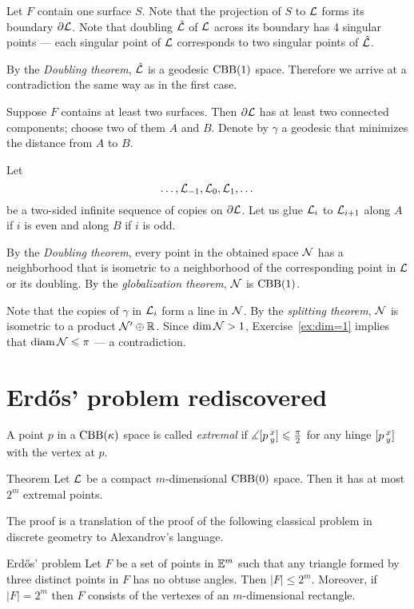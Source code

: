 Let $F$ contain one surface $S$.
Note that the projection of $S$ to $\mathcal{L}$ forms its boundary $\partial \mathcal{L}$.
Note that doubling $\hat {\mathcal{L}}$ of $\mathcal{L}$ across its boundary has 4 singular points --- each singular point of $\mathcal{L}$ corresponds to two singular points of $\hat {\mathcal{L}}$.

By the \emph{Doubling theorem}, $\hat {\mathcal{L}}$ is a geodesic $\mathrm{CBB}(1)$ space.
Therefore we arrive at a contradiction the same way as in the first case.

Suppose $F$ contains at least two surfaces.
Then $\partial\mathcal{L}$ has at least two connected components; choose two of them $A$ and $B$.
Denote by $\gamma$ a geodesic that minimizes the distance from $A$ to $B$.

Let 
\[\dots,\mathcal{L}_{-1},\mathcal{L}_{0},\mathcal{L}_{1},\dots\]
be a two-sided infinite sequence of copies on $\partial\mathcal{L}$.
Let us glue $\mathcal{L}_{i}$ to $\mathcal{L}_{i+1}$ along $A$ if $i$ is even and along $B$ if $i$ is odd.

By the \emph{Doubling theorem}, every point in the obtained space $\mathcal{N}$ has a neighborhood that is isometric to a neighborhood of the corresponding point in $\mathcal{L}$ or its doubling.
By the \emph{globalization theorem}, $\mathcal{N}$ is $\mathrm{CBB}(1)$.

Note that the copies of $\gamma$ in $\mathcal{L}_{i}$ form a line in $\mathcal{N}$.
By the \emph{splitting theorem}, $\mathcal{N}$ is isometric to a product $\mathcal{N}'\oplus \mathbb{R}$.
Since $\operatorname{\rm dim}\nolimits\mathcal{N}>1$, Exercise~\ref{ex:dim=1} implies that $\operatorname{\rm diam}\nolimits\mathcal{N}\leqslant \pi$ --- a contradiction.
\qeds

\section{Erd\H{o}s' problem rediscovered}

A point $p$ in a $\mathrm{CBB}(\kappa)$ space is called \emph{extremal} if $\measuredangle[p\,{}^{x}_{y}]\leqslant \tfrac\pi2$ for any hinge $[p\,{}^{x}_{y}]$ with the vertex at $p$. 

\begin{thm}{Theorem}\label{thm:extr-point}
Let $\mathcal{L}$ be a compact $m$-dimensional $\mathrm{CBB}(0)$ space.
Then it has at most $2^m$ extremal points.
\end{thm}

The proof is a translation of the proof of the following classical problem in discrete geometry to Alexandrov's language.

\begin{thm}{Erd\H{o}s' problem}
Let $F$ be a set of points in $\mathbb{E}^m$ such that any triangle formed by three distinct points in $F$ has no obtuse angles.
Then  $|F|\le2^m$.
Moreover, if $|F|=2^m$ then $F$ consists of the vertexes of an $m$-dimensional rectangle.
\end{thm}


